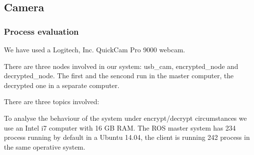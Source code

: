 \documentclass[journal,twoside]{JoPhA}
\begin{document}
% 
% 



\subsection{Camera}


\subsubsection{Process evaluation}

We have used a Logitech, Inc. QuickCam Pro 9000 webcam.

There are three nodes involved in our system: usb\_cam, encrypted\_node and decrypted\_node. The first and the sencond run in the master computer, the decrypted one in a separate computer.

There are three topics involved: 

To analyse the behaviour of the system under encrypt/decrypt circumstances we use an Intel i7 computer with 16 GB RAM. The ROS master system has 234 process running by default in a Ubuntu 14.04, the client is running 242 process in the same operative system.
\end{document}
